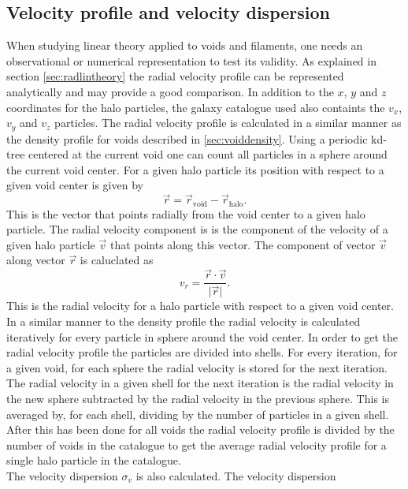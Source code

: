 \subsection{Velocity profile and velocity dispersion}\label{sec:voidvel}
When studying linear theory applied to voids and filaments, one needs an observational or
numerical representation to test its validity. As explained in section
\ref{sec:radlintheory} the radial velocity profile can be represented analytically and
may provide a good comparison. In addition to the $x$, $y$ and $z$ coordinates for the
halo particles, the galaxy catalogue used also containts the $v_x$, $v_y$ and
$v_z$ particles. The radial velocity profile is calculated in a
similar manner as the density profile for voids described in
\ref{sec:voiddensity}. Using a periodic kd-tree centered at the current void one
can count all particles in a sphere around the current void center. For a given
halo particle its position with respect to a given void center is given by
\begin{equation}\label{eq:voidpos}
    \vec{r}=\vec{r}_{\mathrm{void}}-\vec{r}_{\mathrm{halo}}.
\end{equation}
This is the vector that points radially from the void center to a given halo
particle. The radial velocity component is is the component of the velocity of a
given halo particle $\vec{v}$ that points along this vector. The component of vector
$\vec{v}$ along vector $\vec{r}$ is caluclated as
\begin{equation}
    v_r=\frac{\vec{r}\cdot\vec{v}}{\vert\vec{r}\vert}.
\end{equation}
This is the radial velocity for a halo particle with respect to a given void
center. In a similar manner to the density profile the radial velocity is
calculated iteratively for every particle in sphere around the void center. In
order to get the radial velocity profile the particles are divided into
shells. For every iteration, for a given void, for each sphere the radial
velocity is stored for the next iteration. The radial velocity in a given shell
for the next iteration is the radial velocity in the new sphere subtracted by
the radial velocity in the previous sphere. This is averaged by, for each shell,
dividing by the number of particles in a given shell. After this has
been done for all voids the radial velocity profile is divided by the number of voids in the catalogue to get
the average radial velocity profile for a single halo particle in the catalogue.
\\\indent
The velocity dispersion $\sigma_v$ is also calculated. The velocity dispersion
